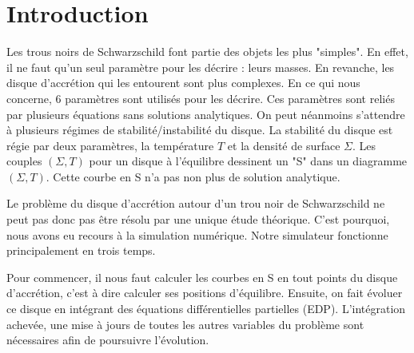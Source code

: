 \section*{Introduction}

Les trous noirs de Schwarzschild font partie des objets les plus "simples". En effet, il ne faut qu'un seul paramètre pour les décrire : leurs masses. En revanche, les disque d'accrétion qui les entourent sont plus complexes. En ce qui nous concerne, 6 paramètres sont utilisés pour les décrire. Ces paramètres sont reliés par plusieurs équations sans solutions analytiques. On peut néanmoins s'attendre à plusieurs régimes de stabilité/instabilité du disque. La stabilité du disque est régie par deux paramètres, la température  $T$ et la densité de surface $\Sigma$. Les couples $(\Sigma, T)$ pour un disque à l'équilibre dessinent un "S" dans un diagramme $(\Sigma, T)$. Cette courbe en S n'a pas non plus de solution analytique. 

Le problème du disque d'accrétion autour d'un trou noir de Schwarzschild ne peut pas donc pas être résolu par une unique étude théorique. C'est pourquoi, nous avons eu recours à la simulation numérique. Notre simulateur fonctionne principalement en trois temps.

Pour commencer, il nous faut calculer les courbes en S en  tout points du disque d'accrétion, c'est à dire calculer ses positions d'équilibre. Ensuite, on fait évoluer ce disque en intégrant des équations différentielles partielles (EDP). L'intégration achevée, une mise à jours de toutes les autres variables du problème sont nécessaires afin de poursuivre l'évolution. 

